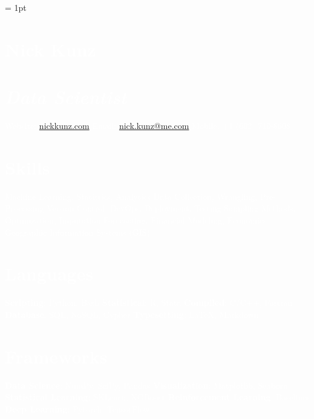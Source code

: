 \documentclass{article}
\author{Nick Kunz}
\begin{document}
\noindent
\scriptsize
{}\font = 1pt
    \begin{bgbox}[
        height = \paperheight,
        width = 0.3\textwidth,
        colback = gray
    ]
        \textcolor{white}{
            \section*{Nick Kunz}
            \section*{\textit{\normalsize{Data Scientist}}}
                Website: \space\space\space\space\space\url{nickkunz.com}\newline
                Email: \space\space\space\space\space\space\space\space\space\url{nick.kunz@me.com}\newline
                Mobile: \space\space\space\space\space\space+1 $($602$)$ 710-8608
            \section*{Skills}
                Machine Learning, Statistics, Analytics\newline
                Data Collection, Wrangling, Pre-Processing\newline
                Version Control, DevOps, Deployment, Testing\newline
                Sampling Methods, Optimization, Imputation\newline
                Forecasting, Financial Modeling, Economics\newline
                Geographic Information Systems (GIS)
            \section*{Languages}
                \textbf{Scripting}: Python, Bash\newline
                \textbf{Statistical}: R, Stata\newline
                \textbf{Compiled}: C/C++, Fortran\newline
                \textbf{Database}: SQL, NoSQL, Cypher\newline
                \textbf{Typesetting}: \LaTeX, Markdown
            \section*{Frameworks}
                \textbf{Data Science}: NumPy, SciPy, Pandas\newline
                \textbf{Visualization}: Matplotlib, Seaborn\newline
                \textbf{Statistical Learning}: SKLearn, XGBoost\newline
                \textbf{Reinforcement Learning}: Baselines\newline
                \textbf{Deep Learning}: Pytorch, TensorFlow
}
\end{bgbox}
\end{document}
